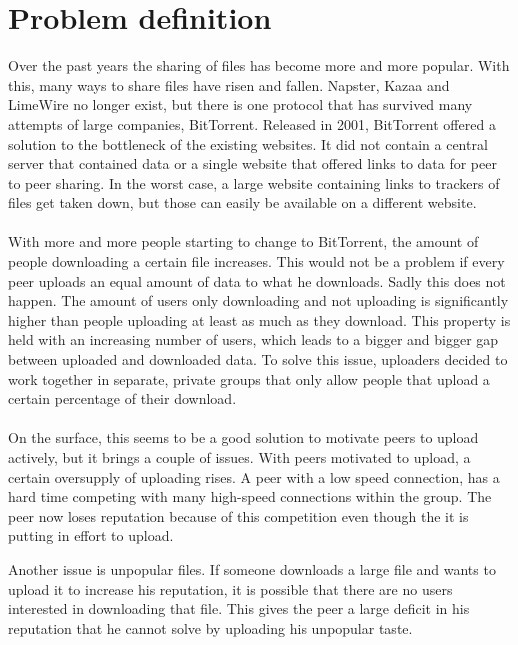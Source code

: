 \section{Problem definition}
Over the past years the sharing of files has become more and more popular. 
With this, many ways to share files have risen and fallen.
Napster, Kazaa and LimeWire no longer exist, but there is one protocol that has survived many attempts of large companies, BitTorrent.
Released in 2001, BitTorrent offered a solution to the bottleneck of the existing websites.
It did not contain a central server that contained data or a single website that offered links to data for peer to peer sharing.
In the worst case, a large website containing links to trackers of files get taken down, but those can easily be available on a different website. \\
\\
With more and more people starting to change to BitTorrent, the amount of people downloading a certain file increases.
This would not be a problem if every peer uploads an equal amount of data to what he downloads.
Sadly this does not happen.
The amount of users only downloading and not uploading is significantly higher than people uploading at least as much as they download.
This property is held with an increasing number of users, which leads to a bigger and bigger gap between uploaded and downloaded data.
To solve this issue, uploaders decided to work together in separate, private groups that only allow people that upload a certain percentage of their download.\\
\\
On the surface, this seems to be a good solution to motivate peers to upload actively, but it brings a couple of issues.
With peers motivated to upload, a certain oversupply of uploading rises.
A peer with a low speed connection, has a hard time competing with many high-speed connections within the group. The peer now loses reputation because of this competition even though the it is putting in effort to upload.

Another issue is unpopular files. 
If someone downloads a large file and wants to upload it to increase his reputation, it is possible that there are no users interested in downloading that file. 
This gives the peer a large deficit in his reputation that he cannot solve by uploading his unpopular taste.

